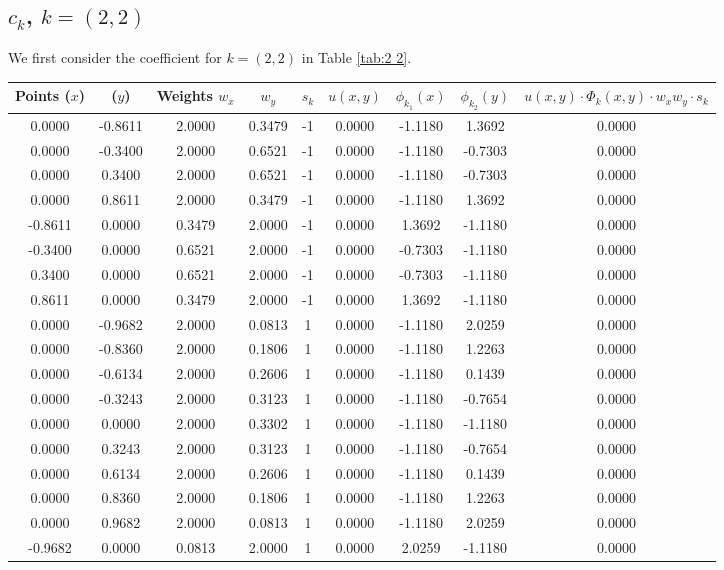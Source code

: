 \documentclass[11pt]{article}
\begin{document}
\subsection{$c_k$, $k=(2,2)$}
We first consider the coefficient for $k=(2,2)$ in Table \ref{tab:2 2}.  
\begin{longtable}{c c|c c|c|c|c c|c}
Points ($x$) & ($y$) & Weights $w_x$ & $w_y$ & $s_k$ & $u(x,y)$ & $\phi_{k_1}(x)$ & $\phi_{k_2}(y)$ &
     $u(x,y)\cdot\Phi_k(x,y)\cdot w_xw_y\cdot s_k$\\ \hline
0.0000 & -0.8611 & 2.0000 & 0.3479 & -1 & 0.0000 & -1.1180 & 1.3692 & 0.0000 \\
0.0000 & -0.3400 & 2.0000 & 0.6521 & -1 & 0.0000 & -1.1180 & -0.7303 & 0.0000 \\
0.0000 & 0.3400 & 2.0000 & 0.6521 & -1 & 0.0000 & -1.1180 & -0.7303 & 0.0000 \\
0.0000 & 0.8611 & 2.0000 & 0.3479 & -1 & 0.0000 & -1.1180 & 1.3692 & 0.0000 \\
-0.8611 & 0.0000 & 0.3479 & 2.0000 & -1 & 0.0000 & 1.3692 & -1.1180 & 0.0000 \\
-0.3400 & 0.0000 & 0.6521 & 2.0000 & -1 & 0.0000 & -0.7303 & -1.1180 & 0.0000 \\
0.3400 & 0.0000 & 0.6521 & 2.0000 & -1 & 0.0000 & -0.7303 & -1.1180 & 0.0000 \\
0.8611 & 0.0000 & 0.3479 & 2.0000 & -1 & 0.0000 & 1.3692 & -1.1180 & 0.0000 \\
0.0000 & -0.9682 & 2.0000 & 0.0813 & 1 & 0.0000 & -1.1180 & 2.0259 & 0.0000 \\
0.0000 & -0.8360 & 2.0000 & 0.1806 & 1 & 0.0000 & -1.1180 & 1.2263 & 0.0000 \\
0.0000 & -0.6134 & 2.0000 & 0.2606 & 1 & 0.0000 & -1.1180 & 0.1439 & 0.0000 \\
0.0000 & -0.3243 & 2.0000 & 0.3123 & 1 & 0.0000 & -1.1180 & -0.7654 & 0.0000 \\
0.0000 & 0.0000 & 2.0000 & 0.3302 & 1 & 0.0000 & -1.1180 & -1.1180 & 0.0000 \\
0.0000 & 0.3243 & 2.0000 & 0.3123 & 1 & 0.0000 & -1.1180 & -0.7654 & 0.0000 \\
0.0000 & 0.6134 & 2.0000 & 0.2606 & 1 & 0.0000 & -1.1180 & 0.1439 & 0.0000 \\
0.0000 & 0.8360 & 2.0000 & 0.1806 & 1 & 0.0000 & -1.1180 & 1.2263 & 0.0000 \\
0.0000 & 0.9682 & 2.0000 & 0.0813 & 1 & 0.0000 & -1.1180 & 2.0259 & 0.0000 \\
-0.9682 & 0.0000 & 0.0813 & 2.0000 & 1 & 0.0000 & 2.0259 & -1.1180 & 0.0000 \\

\end{longtable}
\end{document}
